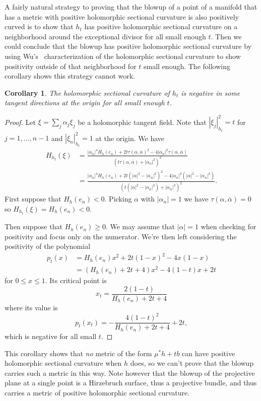 \documentclass[10pt,a4paper]{amsart}
\newtheorem{coro}[theo]{Corollary}
\def\ton{\alpha}
\def\hsc{holomorphic sectional curvature}
\begin{document}
A fairly natural strategy to proving that the blowup of a point of a manifold
that has a metric with positive \hsc{} is also positively curved is to
show that $h_t$ has positive \hsc{} on a neighborhood around the exceptional
divisor for all small enough $t$. Then we could conclude that the blowup has
positive \hsc{} by using Wu's~\cite{wu1973remark} characterization of the
\hsc{} to show positivity outside of that neighborhood for $t$ small enough.
The following corollary shows this strategy cannot work.


\begin{coro}
The holomorphic sectional curvature of $h_t$ is negative in
some tangent directions at the origin for all small enough $t$.
\end{coro}

\begin{proof}
Let $\xi = \sum_j \ton_j \xi_j$ be a holomorphic tangent field.
Note that $|\xi_j|_{h_t}^2 = t$ for $j = 1, \ldots, n-1$ and $|\xi_n|_{h_t}^2 = 1$
at the origin.
We have
\begin{align*}
H_{h_t}(\xi)
&= \frac{|\ton_n|^4 H_h(e_n)
+ 2t \tau(\ton, \bar \ton)^2
- 4 |\ton_n|^2 \tau(\ton, \bar \ton)}{(t \tau(\ton, \bar \ton) + |\ton_n|^2)^2}
\\
&= \frac{|\ton_n|^4 H_h(e_n)
+ 2t (|\ton|^2 - |\ton_n|^2)^2
- 4 |\ton_n|^2 (|\ton|^2 - |\ton_n|^2)}{(t (|\ton|^2 - |\ton_n|^2) + |\ton_n|^2)^2}.
\end{align*}
First suppose that $H_h(e_n) < 0$. Picking $\ton$ with $|\ton_n| = 1$ we have
$\tau(\ton, \bar \ton) = 0$ so $H_{h_t}(\xi) = H_h(e_n) < 0$.

Then suppose that $H_h(e_n) \geq 0$.
We may assume that $|\ton| = 1$ when checking for positivity and focus only on
the numerator. We're then left considering the positivity of the polynomial
\begin{align*}
p_t(x)
&= H_h(e_n) x^2 + 2t(1-x)^2 - 4x(1-x)
\\
&= (H_h(e_n) + 2t + 4) x^2 - 4(1 - t) x + 2t
\end{align*}
for $0 \leq x \leq 1$.
Its critical point is
$$
x_t = \frac{2(1-t)}{H_h(e_n) + 2t + 4}
$$
where its value is
$$
p_t(x_t) = -\frac{4(1-t)^2}{H_h(e_n) + 2t + 4} + 2t,
$$
which is negative for all small $t$.
\end{proof}


This corollary shows that \emph{no} metric of the form $\mu^* h + tb$ can have
positive \hsc{} when $h$ does, so we can't prove that the blowup carries such
a metric in this way.
Note however that the blowup of the projective plane at a single point
is a Hirzebruch surface, thus a projective bundle, and thus carries
a metric of positive \hsc{}.
\end{document}
